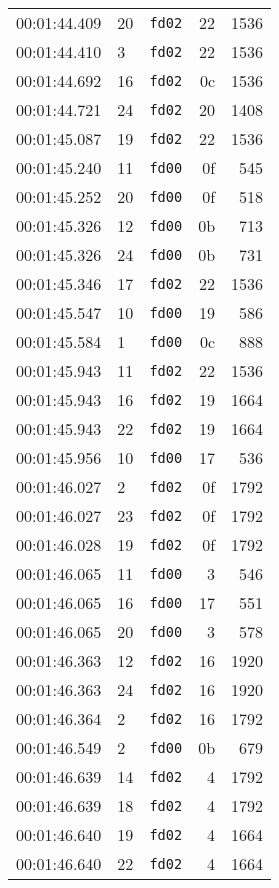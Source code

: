 \documentclass{article}
\begin{document}
\begin{longtable}{lllrr}
00:01:44.409 & 20 & \texttt{fd02} & 22 & 1536 \\
00:01:44.410 & 3 & \texttt{fd02} & 22 & 1536 \\
00:01:44.692 & 16 & \texttt{fd02} & 0c & 1536 \\
00:01:44.721 & 24 & \texttt{fd02} & 20 & 1408 \\
00:01:45.087 & 19 & \texttt{fd02} & 22 & 1536 \\
00:01:45.240 & 11 & \texttt{fd00} & 0f & 545 \\
00:01:45.252 & 20 & \texttt{fd00} & 0f & 518 \\
00:01:45.326 & 12 & \texttt{fd00} & 0b & 713 \\
00:01:45.326 & 24 & \texttt{fd00} & 0b & 731 \\
00:01:45.346 & 17 & \texttt{fd02} & 22 & 1536 \\
00:01:45.547 & 10 & \texttt{fd00} & 19 & 586 \\
00:01:45.584 & 1 & \texttt{fd00} & 0c & 888 \\
00:01:45.943 & 11 & \texttt{fd02} & 22 & 1536 \\
00:01:45.943 & 16 & \texttt{fd02} & 19 & 1664 \\
00:01:45.943 & 22 & \texttt{fd02} & 19 & 1664 \\
00:01:45.956 & 10 & \texttt{fd00} & 17 & 536 \\
00:01:46.027 & 2 & \texttt{fd02} & 0f & 1792 \\
00:01:46.027 & 23 & \texttt{fd02} & 0f & 1792 \\
00:01:46.028 & 19 & \texttt{fd02} & 0f & 1792 \\
00:01:46.065 & 11 & \texttt{fd00} & 3 & 546 \\
00:01:46.065 & 16 & \texttt{fd00} & 17 & 551 \\
00:01:46.065 & 20 & \texttt{fd00} & 3 & 578 \\
00:01:46.363 & 12 & \texttt{fd02} & 16 & 1920 \\
00:01:46.363 & 24 & \texttt{fd02} & 16 & 1920 \\
00:01:46.364 & 2 & \texttt{fd02} & 16 & 1792 \\
00:01:46.549 & 2 & \texttt{fd00} & 0b & 679 \\
00:01:46.639 & 14 & \texttt{fd02} & 4 & 1792 \\
00:01:46.639 & 18 & \texttt{fd02} & 4 & 1792 \\
00:01:46.640 & 19 & \texttt{fd02} & 4 & 1664 \\
00:01:46.640 & 22 & \texttt{fd02} & 4 & 1664 \\

\end{longtable}
\end{document}
